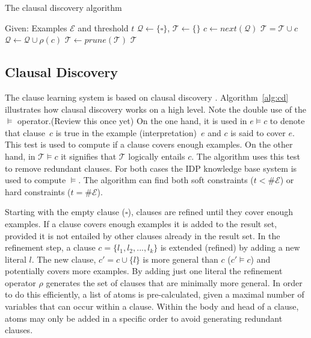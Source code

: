 \documentclass[letterpaper]{article}
\newcommand{\sym}[1]{\ensuremath{\mathcal{#1}}}
\theoremstyle{definition}
\newcommand{\sam}[1]{{\color{red}(#1)}}
\begin{document}
\begin{algorithm}
  \caption{The clausal discovery algorithm}
  \label{alg:cd}

  \begin{algorithmic}
  \State Given: Examples \sym{E} and threshold $t$
  \State $\sym{Q} \gets \{\square\}$, $\sym{T} \gets \{\}$
  \While{$\#\sym{Q} > 0$}
    \State $c \gets next(\sym{Q})$
    \If{$\#\{e \in \sym{E} | e \models c\} \geq t$}
      \If{$\lnot (\sym{T} \models c)$}
        \State $\sym{T} = \sym{T} \cup c$
      \EndIf
    \Else
      \State $\sym{Q} \gets \sym{Q} \cup \rho(c)$
    \EndIf
  \EndWhile
  \State $\sym{T} \gets prune(\sym{T})$
  \State \Return \sym{T}
  \end{algorithmic}
\end{algorithm}

\subsection{Clausal Discovery}
The clause learning system is based on clausal discovery \cite{DeRaedt:ClausalDiscovery}.
Algorithm~\ref{alg:cd} illustrates how clausal discovery works on a high level.
Note the double use of the $\models$ operator.\sam{Review this once yet}
On the one hand, it is used in $e \models c$ to denote that clause~$c$ is true in the example (interpretation)~$e$ and $c$ is said to cover $e$.
This test is used to compute if a clause covers enough examples.
On the other hand, in $\sym{T} \models c$ it signifies that \sym{T} logically entails $c$.
The algorithm uses this test to remove redundant clauses.
For both cases the IDP knowledge base system \cite{de2013prototype,wittocx2008idp} is used to compute $\models$.
The algorithm can find both soft constraints ($t < \# \sym{E}$) or hard constraints ($t = \# \sym{E}$).

Starting with the empty clause ($\square$), clauses are refined until they cover enough examples.
If a clause covers enough examples it is added to the result set, provided it is not entailed by other clauses already in the result set.
In the refinement step, a clause $c = \{l_1, l_2, ..., l_k\}$ is extended (refined) by adding a new literal $l$.
The new clause, $c' = c \cup \{l\}$ is more general than $c$ ($c' \models c$) and potentially covers more examples.
By adding just one literal the refinement operator $\rho$ generates the set of clauses that are minimally more general.
In order to do this efficiently, a list of atoms is pre-calculated, given a maximal number of variables that can occur within a clause.
Within the body and head of a clause, atoms may only be added in a specific order to avoid generating redundant clauses.
\end{document}
